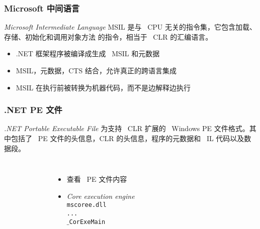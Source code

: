 \begin{frame}
\frametitle{Microsoft 中间语言}

\begin{block}{\textit{Microsoft Intermediate Language}}
  \CJKindent MSIL 是与 ~CPU 无关的指令集，它包含加载、存储、初始化和调用对象方法
  的指令，相当于 ~CLR 的汇编语言。
\end{block}
\pause

\begin{itemize}
\item \small .NET 框架程序被编译成生成 ~MSIL 和元数据
\item \small MSIL，元数据，CTS 结合，允许真正的跨语言集成
\item \small MSIL 在执行前被转换为机器代码，而不是边解释边执行
\end{itemize}
\pause

\begin{figure}[h] 
  \centering 
\end{figure}

\end{frame}

\begin{frame}
\frametitle{ .NET PE 文件}
\begin{block}{\textit{.NET Portable Executable File}}
\CJKindent \small  为支持 ~CLR 扩展的 ~Windows PE 文件格式。其中包括了 ~PE 文件的头信息，CLR 的头信息，程序的元数据和
  ~IL 代码以及数据段。
\end{block}
\pause
\begin{columns}
  \begin{figure}[htbp]
    \centering
    
  \end{figure}
\pause
\begin{itemize}
\item 查看 ~PE 文件内容\\
{\footnotesize {}}
\vskip4pt
\item \textit{Core execution engine} \\
{\color{red!40!black} \texttt{mscoree.dll}\\
\texttt{...}\\
\texttt{$\_$CorExeMain}}

\end{itemize}
\end{columns}

\end{frame}

